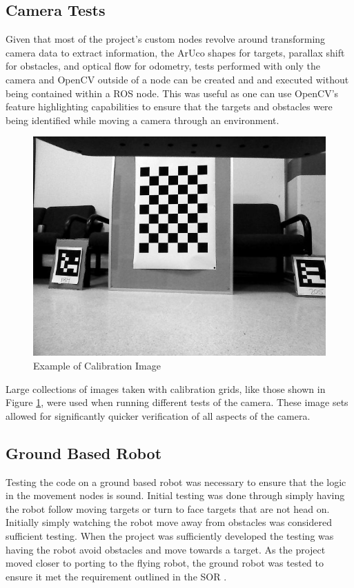 \documentclass{article}[12]
\begin{document}
	\subsection{Camera Tests}
	
	Given that most of the project's custom nodes revolve around transforming camera data to extract information, the ArUco shapes for targets, parallax shift for obstacles, and optical flow for odometry, tests performed with only the camera and OpenCV outside of a node can be created and and executed without being contained within a ROS node. This was useful as one can use OpenCV's feature highlighting capabilities to ensure that the targets and obstacles were being identified while moving a camera through an environment. 
	
	\begin{figure}[]
		\centering
		\includegraphics[width=0.5\linewidth]{calibration}
		\caption{Example of Calibration Image}
		\label{fig:calbcalbcalb}
	\end{figure}
	
	Large collections of images taken with calibration grids, like those shown in Figure \ref{fig:calbcalbcalb}, were used when running different tests of the camera. These image sets allowed for significantly quicker verification of all aspects of the camera.
	
	\subsection{Ground Based Robot}
	
	Testing the code on a ground based robot was necessary to ensure that the logic in the movement nodes is sound. Initial testing was done through simply having the robot follow moving targets or turn to face targets that are not head on. Initially simply watching the robot move away from obstacles was considered sufficient testing. When the project was sufficiently developed the testing was having the robot avoid obstacles and move towards a target. As the project moved closer to porting to the flying robot, the ground robot was tested to ensure it met the requirement outlined in the SOR \cite{sor}. 
\end{document}
